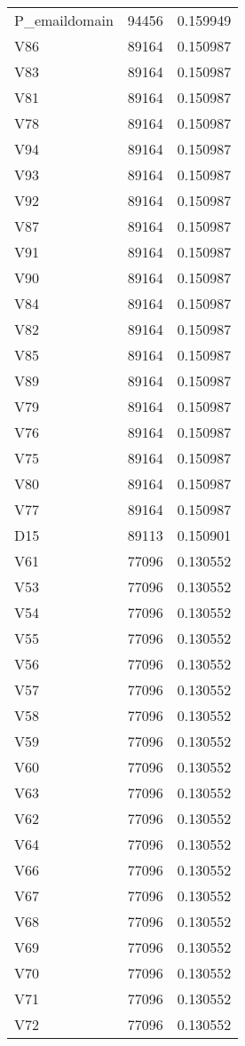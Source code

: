 \begin{tabular}{lrr}
P_emaildomain & 94456 & 0.159949 \\
V86 & 89164 & 0.150987 \\
V83 & 89164 & 0.150987 \\
V81 & 89164 & 0.150987 \\
V78 & 89164 & 0.150987 \\
V94 & 89164 & 0.150987 \\
V93 & 89164 & 0.150987 \\
V92 & 89164 & 0.150987 \\
V87 & 89164 & 0.150987 \\
V91 & 89164 & 0.150987 \\
V90 & 89164 & 0.150987 \\
V84 & 89164 & 0.150987 \\
V82 & 89164 & 0.150987 \\
V85 & 89164 & 0.150987 \\
V89 & 89164 & 0.150987 \\
V79 & 89164 & 0.150987 \\
V76 & 89164 & 0.150987 \\
V75 & 89164 & 0.150987 \\
V80 & 89164 & 0.150987 \\
V77 & 89164 & 0.150987 \\
D15 & 89113 & 0.150901 \\
V61 & 77096 & 0.130552 \\
V53 & 77096 & 0.130552 \\
V54 & 77096 & 0.130552 \\
V55 & 77096 & 0.130552 \\
V56 & 77096 & 0.130552 \\
V57 & 77096 & 0.130552 \\
V58 & 77096 & 0.130552 \\
V59 & 77096 & 0.130552 \\
V60 & 77096 & 0.130552 \\
V63 & 77096 & 0.130552 \\
V62 & 77096 & 0.130552 \\
V64 & 77096 & 0.130552 \\
V66 & 77096 & 0.130552 \\
V67 & 77096 & 0.130552 \\
V68 & 77096 & 0.130552 \\
V69 & 77096 & 0.130552 \\
V70 & 77096 & 0.130552 \\
V71 & 77096 & 0.130552 \\
V72 & 77096 & 0.130552 \\

\end{tabular}
